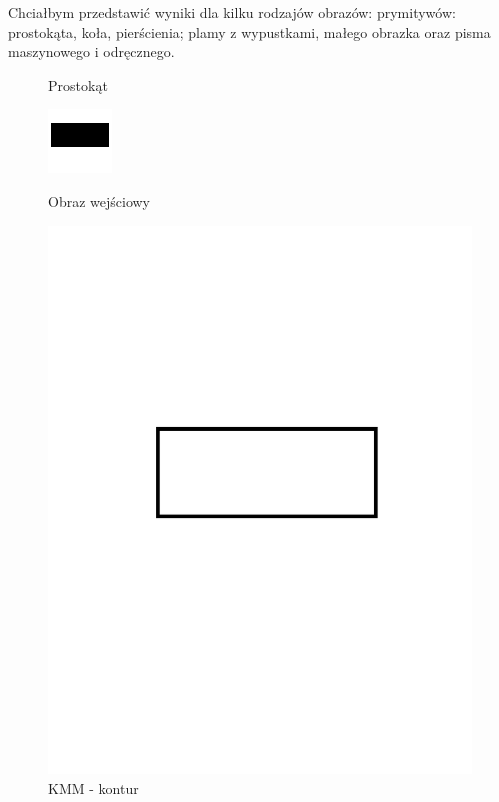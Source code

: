 \documentclass[11pt]{article}
\begin{document}
\par
Chciałbym przedstawić wyniki dla kilku rodzajów obrazów: prymitywów: prostokąta, koła, pierścienia; plamy z wypustkami, małego obrazka oraz pisma maszynowego i odręcznego.

\begin{figure}[!ht] 
  \caption{Prostokąt}
  \label{ fig7} 
  \begin{minipage}[b]{0.5\linewidth}
    \centering
    \includegraphics[width=.5\linewidth]{../images/rectangle} 
    \caption{Obraz wejściowy} 
    \vspace{4ex}
  \end{minipage}%
  \begin{minipage}[b]{0.5\linewidth}
    \centering
    \includegraphics[width=.5\linewidth]{../samples/rect_kmm_contour} 
    \caption{KMM - kontur} 
    \vspace{4ex}
  \end{minipage} 
  \begin{minipage}[b]{0.5\linewidth}
    \centering

\end{minipage}
\end{figure}
\end{document}
